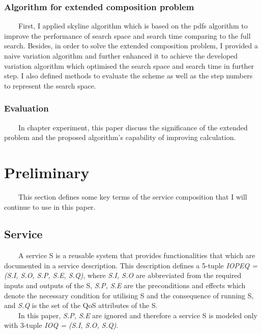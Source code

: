 \documentclass[senior,final,11pt]{iscs-thesis}
\begin{document}
\subsection{Algorithm for extended composition problem}
~~~~First, I applied skyline algorithm which is based on the pdfs algorithm to improve the performance of search space and search time comparing to the full search. 
Besides, in order to solve the extended composition problem, I provided a naive variation algorithm and further enhanced it to achieve the developed variation algorithm which optimised the search space and search time in further step. 
I also defined methods to evaluate the scheme as well as the step numbers to represent the search space.
\subsection{Evaluation}
~~~~In chapter experiment, this paper discuss the significance of the extended problem and the proposed algorithm's capability of improving calculation.

\chapter{Preliminary}%
~~~~This section defines some key terms of the service composition that I will continue to use in this paper.
\section{Service}
~~~~A service S is a reusable system that provides functionalities that which are documented in a service description. This description defines a 5-tuple {\em IOPEQ = (S.I, S.O, S.P, S.E, S.Q)}, where {\em S.I, S.O} are abbreviated from the required inputs and outputs of the S, {\em S.P, S.E} are the preconditions and effects which denote the necessary condition for utilising S and the consequence of running S, and {\em S.Q} is the set of the QoS attributes of the S\cite{9}. \\
~~~~In this paper, {\em S.P, S.E} are ignored and therefore a service S is modeled only with 3-tuple {\em IOQ = (S.I, S.O, S.Q)}.
\end{document}
